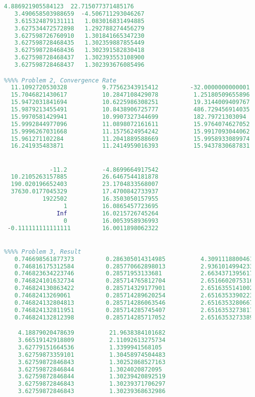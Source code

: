 \begin{lstlisting}[language = MATLAB]
   4.886921905584123  22.715077371485176
   3.490658503988659  -4.506711293046267
   3.615324879131111   1.083016831494885
   3.627534472572898   1.292788274456279
   3.627598726760910   1.301841665347230
   3.627598728468435   1.302359887855449
   3.627598728468436   1.302391582830418
   3.627598728468437   1.302393553108900
   3.627598728468437   1.302393676085496

%%%% Problem 2, Convergence Rate
  11.1092720530328          9.77562343915412         -32.0000000000001
  15.7046821430617          10.2847108429078          1.25180509655896
  15.9472031841694          10.6225986308251          19.3144009409767
  15.9879213455491          10.8438906725777          486.729456914035
  15.9970581429941          10.9907327344699          182.79721303094
  15.9992844977096          11.0898072161611          15.9764074627052
  15.9996267031668          11.1575624954242          15.9917093044062
  15.961271102284           11.2041889588669          15.9958933089974
  16.241935483871           11.2414959016393          15.9437830687831


             -11.2          -4.8699664917542
  10.2105263157885          26.6467544181878
  190.020196652403          23.1704833568007
  37630.0177045329          17.4700842733937
           1922502          16.3503050157955
                 1          16.0865457723695
               Inf          16.0215726745264
                 0          16.0053958936993
 -0.111111111111111         16.0011898062322


%%%% Problem 3, Result
   0.746698561877373         0.286305014314985          4.30911188004614
   0.746816175312584         0.285770662898013          2.9361014994233
   0.746823634223746         0.28571953133681           2.66343713956171
   0.746824101632734         0.285714765812704          2.65166020753164
   0.746824130863422         0.285714329177901          2.6516355141002
   0.74682413269061          0.285714289620254          2.65163533902236
   0.746824132804813         0.285714286063546          2.65163532806675
   0.746824132811951         0.285714285745407          2.65163532738174
   0.746824132812398         0.285714285717052          2.65163532733892

    4.18879020478639          21.9638384101682
    3.66519142918809          2.11092613275734
    3.62779151664536          1.3399941568105
    3.62759873359101          1.30458974504483
    3.62759872846843          1.30252868527163
    3.62759872846844          1.3024020872095
    3.62759872846844          1.30239420892519
    3.62759872846843          1.30239371706297
    3.62759872846843          1.30239368632986


\end{lstlisting}
